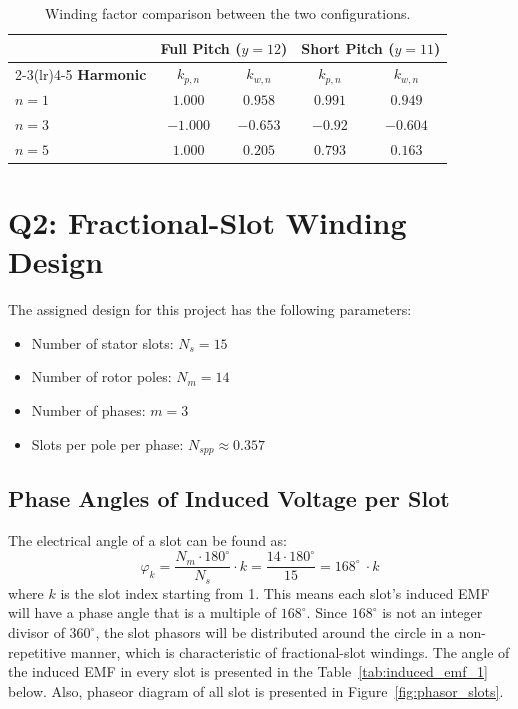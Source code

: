 \documentclass[12pt, a4paper]{article}
\begin{document}
\begin{table}[h!]
\centering
\caption{Winding factor comparison between the two configurations.}
\begin{tabular}{lcccc}
\toprule
 & \multicolumn{2}{c}{\textbf{Full Pitch ($y = 12$)}} & \multicolumn{2}{c}{\textbf{Short Pitch ($y = 11$)}} \\
\cmidrule(lr){2-3}\cmidrule(lr){4-5}
\textbf{Harmonic} & $k_{p,n}$ & $k_{w,n}$ & $k_{p,n}$ & $k_{w,n}$ \\
\midrule
$n=1$ & $1.000$ & $0.958$ & $0.991$ & $0.949$ \\
$n=3$ & $-1.000$ & $-0.653$ & $-0.92$ & $-0.604$ \\
$n=5$ & $1.000$ & $0.205$ & $0.793$ & $0.163$ \\
\bottomrule
\end{tabular}
\end{table}



\section{Q2: Fractional-Slot Winding Design}
The assigned design for this project has the following parameters:

\begin{itemize}
    \item Number of stator slots: $N_s = 15$
    \item Number of rotor poles: $N_m = 14$
    \item Number of phases: $m = 3$
    \item Slots per pole per phase: $N_{spp} \approx 0.357$
\end{itemize}

\subsection{Phase Angles of Induced Voltage per Slot}

The electrical angle of a slot can be found as:
\[\varphi_k = \frac{N_m \cdot 180^\circ}{N_s} \cdot k = \frac{14 \cdot 180^\circ}{15} = 168^\circ\ \cdot k\]
where $k$ is the slot index starting from 1. This means each slot's induced EMF will have a phase angle that is a multiple of $168^\circ$. Since $168^\circ$ is not an integer divisor of $360^\circ$, the slot phasors will be distributed around the circle in a non-repetitive manner, which is characteristic of fractional-slot windings. The angle of the induced EMF in every slot is presented in the Table~\ref{tab:induced_emf_1} below. Also, phaseor diagram of all slot is presented in Figure~\ref{fig:phasor_slots}.
\end{document}
